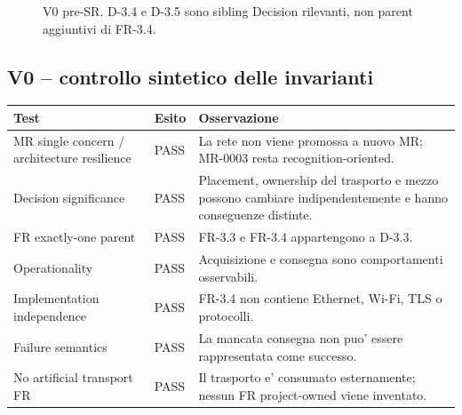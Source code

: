 \documentclass[11pt,a4paper]{article}
\begin{document}
\begin{figure}[h]
\centering
{}
\caption{V0 pre-SR. D-3.4 e D-3.5 sono sibling Decision rilevanti, non parent aggiuntivi di FR-3.4.}
\end{figure}

\subsection{V0 -- controllo sintetico delle invarianti}

\begin{longtable}{p{}p{}p{}}
\toprule
\textbf{Test} & \textbf{Esito} & \textbf{Osservazione} \\
\midrule
\endhead
MR single concern / architecture resilience & PASS & La rete non viene promossa a nuovo MR; MR-0003 resta recognition-oriented. \\
Decision significance & PASS & Placement, ownership del trasporto e mezzo possono cambiare indipendentemente e hanno conseguenze distinte. \\
FR exactly-one parent & PASS & FR-3.3 e FR-3.4 appartengono a D-3.3. \\
Operationality & PASS & Acquisizione e consegna sono comportamenti osservabili. \\
Implementation independence & PASS & FR-3.4 non contiene Ethernet, Wi-Fi, TLS o protocolli. \\
Failure semantics & PASS & La mancata consegna non puo' essere rappresentata come successo. \\
No artificial transport FR & PASS & Il trasporto e' consumato esternamente; nessun FR project-owned viene inventato. \\
\bottomrule
\end{longtable}
\end{document}
